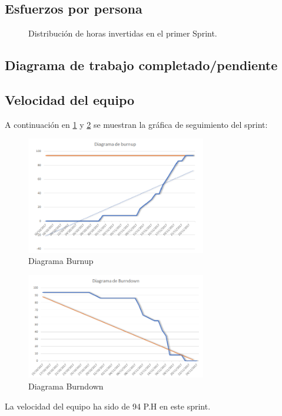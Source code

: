 \documentclass[11pt,a4paper]{report}
\begin{document}
\subsection{Esfuerzos por persona}
\begin{figure}[H]
	\centering
	\caption{Distribución de horas invertidas en el primer Sprint.}
\end{figure}
\subsection{Diagrama de trabajo completado/pendiente}
\subsection{Velocidad del equipo}
A continuación en \ref{fig: burup} y \ref{fig: burdow} se muestran la gráfica de seguimiento del sprint:
\begin{figure}[H]
	\centering
	\includegraphics[width=0.7\textwidth]{capturicas/burnup.png}
	\caption{Diagrama Burnup}
	\label{fig: burup}
\end{figure}
\begin{figure}[H]
\centering
\includegraphics[width=0.7\textwidth]{capturicas/burndown.png}
\caption{Diagrama Burndown}
\label{fig: burdow}
\end{figure}
La velocidad del equipo ha sido de 94 P.H en este sprint.
\end{document}

